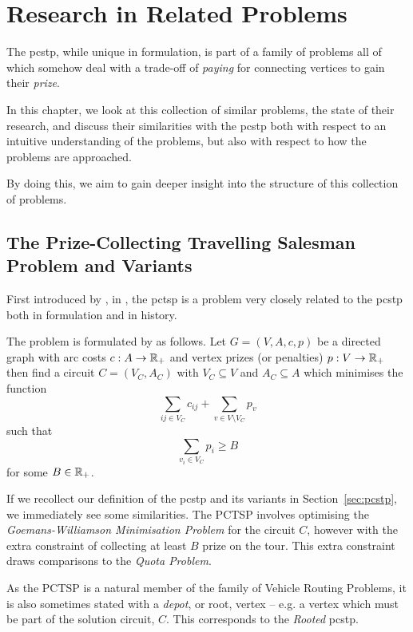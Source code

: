 \chapter{Research in Related Problems}
\label{chap:related}
The \gls{pcstp}, while unique in formulation,
is part of a family of problems all of which somehow deal with a
trade-off of \textit{paying} for connecting vertices to gain their \textit{prize}.

In this chapter, we look at this collection of similar problems,
the state of their research,
and discuss their similarities with the \gls{pcstp}
both with respect to an intuitive understanding of the problems,
but also with respect to how the problems are approached.

By doing this, we aim to gain deeper insight into the structure of
this collection of problems.

\section{The Prize-Collecting Travelling Salesman Problem and Variants}\label{sec:rel:tsp}
First introduced by \citet*{balas1989prize}, in \citeyear{balas1989prize},
the \gls{pctsp} is a problem very closely related to the \gls{pcstp} both
in formulation and in history.

The problem is formulated by \citeauthor{balas1989prize} as follows. Let
$G = (V, A, c, p)$ be a directed
graph with arc costs $c: A \to \mathbb{R}_+$ and vertex prizes (or penalties) $p: V \to \mathbb{R}_+$
then find a circuit $C = (V_C, A_C)$ with $V_C \subseteq V$ and $A_C \subseteq A$ which
minimises the function
\[\sum_{ij \in V_C} c_{ij} + \sum_{v \in V \setminus V_C} p_v\]
such that
\[\sum_{v_i \in V_C} p_i \geq B\]
for some $B \in \mathbb{R}_+$.

If we recollect our definition of the \gls{pcstp}
and its variants in Section~\ref{sec:pcstp},
we immediately see some similarities. The PCTSP involves optimising the
\textit{Goemans-Williamson Minimisation Problem} for the circuit $C$,
however with the extra
constraint of collecting at least $B$ prize on the tour.
This extra constraint draws comparisons
to the \textit{Quota Problem}.

As the PCTSP is a natural member of the family of Vehicle Routing Problems, it is also sometimes
stated with a \textit{depot}, or root,
vertex \citep{feillet2005traveling} -- e.g. a vertex which
must be part of the solution circuit, $C$. This corresponds to the \textit{Rooted}
\gls{pcstp}.

